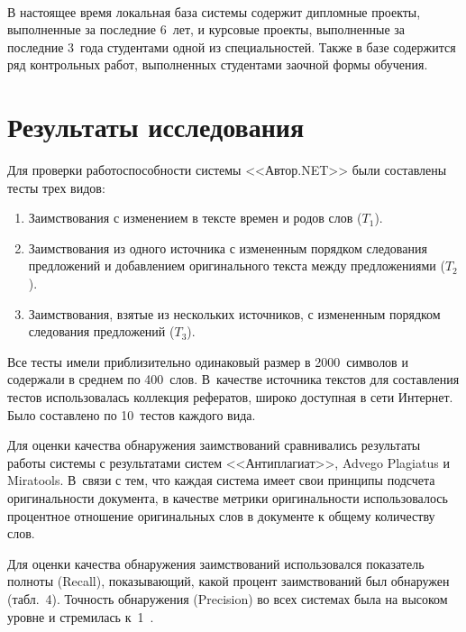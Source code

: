 \begin{multicols}{2}
{}



\begin{figure*} %
\vspace*{1pt}
 \begin{center}
 \mbox{%
 \epsfxsize=160mm
 }
 \end{center}
 \vspace*{-9pt}
\end{figure*}

  
  В настоящее время локальная база сис\-те\-мы содержит дипломные проекты, 
выполненные за последние 6~лет, и курсовые проекты, выполненные за 
последние 3~года студентами одной из специальностей. Также в базе 
содержится ряд контрольных работ, выполненных студентами заочной формы 
обучения. 


\section{Результаты исследования}

  Для проверки работоспособности сис\-те\-мы <<Автор.NET>> были 
составлены тесты трех видов:
  \begin{enumerate}[1.]
\item Заимствования с изменением в тексте времен и родов слов ($T_1$).
\item Заимствования из одного источника с измененным порядком следования 
предложений и добавлением оригинального текста между предложениями 
($T_2$).
\item Заимствования, взятые из нескольких источников, с измененным 
порядком следования предложений ($T_3$).
\end{enumerate}

  Все тесты имели приблизительно одинаковый размер в 2000~символов и 
содержали в среднем по 400~слов. В~качестве источника текстов для 
составления тестов использовалась коллекция рефератов, широко доступная в 
сети Интернет. Было составлено по 10~тестов каждого вида. 
  
  Для оценки качества обнаружения заимствований сравнивались результаты 
работы сис\-те\-мы с результатами сис\-тем <<Антиплагиат>>, {Advego 
Plagiatus} и {Miratools}. В~связи с тем, что каждая сис\-те\-ма имеет свои 
принципы подсчета оригинальности документа, в качестве метрики 
оригинальности использовалось процентное отношение оригинальных слов в 
документе к общему количеству слов.
  
  Для оценки качества обнаружения заимствований использовался показатель 
полноты (Recall), показывающий, какой процент заимствований был 
обнаружен (табл.~4). Точность обнаружения (Precision) во всех 
сис\-те\-мах была на высоком уровне и стремилась к~1~\cite{15-sha}.




\end{multicols}
